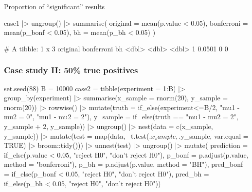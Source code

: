 \documentclass[a4paper]{article}
\begin{document}
Proportion of ``significant'' results
\begin{Schunk}
\begin{Sinput}
case1 |> ungroup() |> 
  summarise(
    original = mean(p.value < 0.05),
    bonferroni = mean(p_bonf < 0.05),
    bh = mean(p_bh < 0.05)
  )
\end{Sinput}
\begin{Soutput}
# A tibble: 1 x 3
  original bonferroni    bh
     <dbl>      <dbl> <dbl>
1   0.0501          0     0
\end{Soutput}
\end{Schunk}
\subsubsection{Case study II: 50\% true positives}
\begin{Schunk}
\begin{Sinput}
set.seed(88)
B = 10000
case2 = tibble(experiment = 1:B) |> 
  group_by(experiment) |> 
  summarise(x_sample = rnorm(20), y_sample = rnorm(20)) |> 
  rowwise() |> 
  mutate(truth = if_else(experiment<=B/2, "mu1 - mu2 = 0", "mu1 - mu2 = 2"),
         y_sample = if_else(truth == "mu1 - mu2 = 2", y_sample + 2, y_sample)) |> 
  ungroup() |> 
  nest(data = c(x_sample, y_sample)) |> 
  mutate(test = map(data, ~t.test(.$x_sample, .$y_sample, var.equal = TRUE) |> 
                      broom::tidy())) |> 
  unnest(test) |> ungroup() |> 
  mutate(
    prediction = if_else(p.value < 0.05, "reject H0", "don't reject H0"),
    p_bonf = p.adjust(p.value, method = "bonferroni"),
    p_bh = p.adjust(p.value, method = "BH"),
    pred_bonf = if_else(p_bonf < 0.05, "reject H0", "don't reject H0"),
    pred_bh = if_else(p_bh < 0.05, "reject H0", "don't reject H0"))
\end{Sinput}
\end{Schunk}
\end{document}
